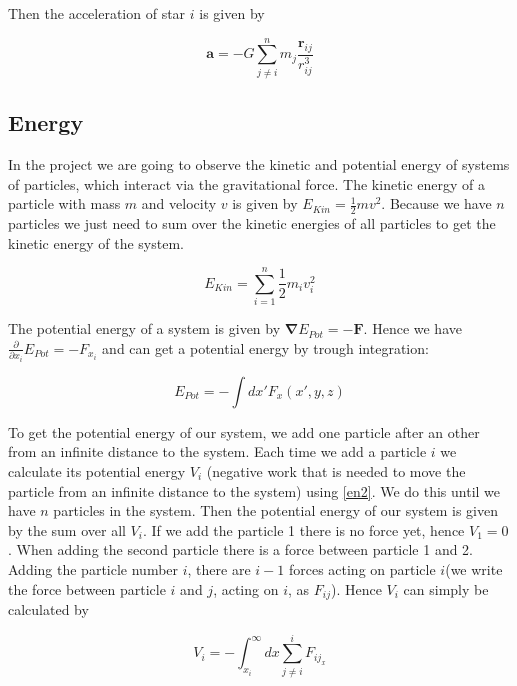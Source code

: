 \documentclass[10pt,a4paper]{article}
\begin{document}
Then the acceleration of star $i$ is given by

\begin{equation}	
\label{eq:gra3}
\mathbf{a} = - G \sum_{j \neq i}^{n} m_j \frac{\mathbf{r}_{ij}}{r_{ij}^3}
\end{equation}

\subsection{Energy}

In the project we are going to observe the kinetic and potential energy of systems of particles, which interact via the gravitational force. The kinetic energy of a particle with mass $m$ and velocity $v$ is given by $E_{Kin} = \frac{1}{2} m v^2$. Because we have $n$ particles we just need to sum over the kinetic energies of all particles to get the kinetic energy of the system.

\begin{equation}	
\label{en1}
E_{Kin} = \sum_{i = 1}^{n} \frac{1}{2} m_i v_i^2
\end{equation}

The potential energy of a system is given by $\mathbf{\nabla} E_{Pot} = - \mathbf{F}$. Hence we have $\frac{\partial}{\partial x_i}E_{Pot} =- F_{x_i}$ and can get a potential energy by trough integration:

\begin{equation}
\label{en2}
	E_{Pot} = - \int dx' F_{x}(x', y ,z)
\end{equation}

To get the potential energy of our system, we add one particle after an other from an infinite distance to the system. Each time we add a particle $i$ we calculate its potential energy $V_i$ (negative work that is needed to move the particle from an infinite distance to the system) using \eqref{en2}. We do this until we have $n$ particles in the system. Then the potential energy of our system is given by the sum over all $V_i$. If we add the particle 1 there is no force yet, hence $V_1 = 0$. When adding the second particle there is a force between particle 1 and 2. Adding the particle number $i$, there are $i-1$ forces acting on particle $i$(we write the force between particle $i$ and $j$, acting on $i$, as $F_{ij}$). Hence $V_i$ can simply be calculated by

\begin{equation}
\label{en3}
	V_i = - \int_{x_i}^{\infty} dx \sum_{j \neq i}^{i} F_{ij_x}
\end{equation}
\end{document}
